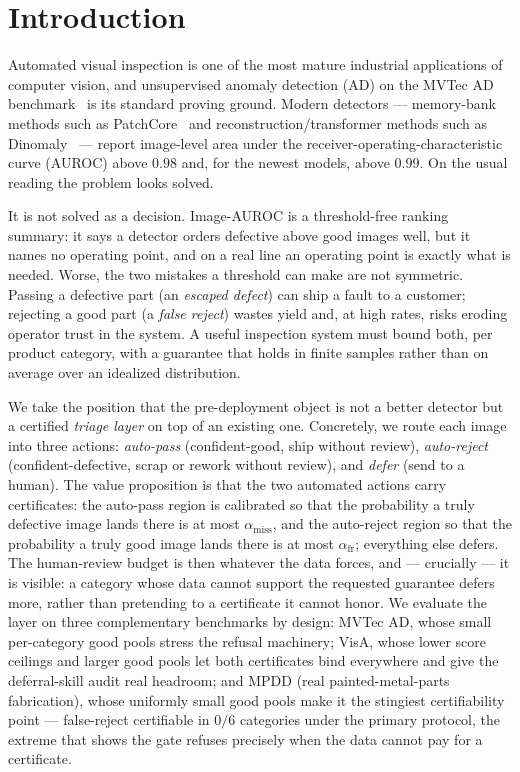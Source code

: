 \documentclass[preprint,11pt]{elsarticle}
\begin{document}

\section{Introduction}
\label{sec:intro}

Automated visual inspection is one of the most mature industrial applications of computer vision,
and unsupervised anomaly detection (AD) on the MVTec AD benchmark~\citep{bergmann2019mvtec} is its
standard proving ground. Modern detectors --- memory-bank methods such as
PatchCore~\citep{roth2022patchcore} and reconstruction/transformer methods such as
Dinomaly~\citep{guo2025dinomaly} --- report image-level area under the receiver-operating-characteristic curve (AUROC) above $0.98$ and, for the newest
models, above $0.99$. On the usual reading the problem looks solved.

It is not solved as a decision. Image-AUROC is a threshold-free ranking summary: it says a
detector orders defective above good images well, but it names no operating point, and on a real
line an operating point is exactly what is needed. Worse, the two mistakes a threshold can make
are not symmetric. Passing a defective part (an \emph{escaped defect}) can ship a fault to a
customer; rejecting a good part (a \emph{false reject}) wastes yield and, at high rates, risks
eroding operator trust in the system. A useful inspection system must bound both, per
product category, with a guarantee that holds in finite samples rather than on average over an
idealized distribution.

We take the position that the pre-deployment object is not a better detector but a certified
\emph{triage layer} on top of an existing one. Concretely, we route each image into three actions:
\emph{auto-pass} (confident-good, ship without review), \emph{auto-reject} (confident-defective,
scrap or rework without review), and \emph{defer} (send to a human). The value proposition is that
the two automated actions carry certificates: the auto-pass region is calibrated so that the
probability a truly defective image lands there is at most $\alpha_{\text{miss}}$, and the
auto-reject region so that the probability a truly good image lands there is at most
$\alpha_{\text{fr}}$; everything else defers. The human-review budget is then whatever the data
forces, and --- crucially --- it is visible: a category whose data cannot support the
requested guarantee defers more, rather than pretending to a certificate it cannot honor.
We evaluate the layer on three complementary benchmarks by design: MVTec AD, whose small
per-category good pools stress the refusal machinery; VisA, whose lower score ceilings and
larger good pools let both certificates bind everywhere and give the deferral-skill audit real
headroom; and MPDD (real painted-metal-parts fabrication), whose uniformly small good pools make
it the stingiest certifiability point --- false-reject certifiable in $0/6$ categories under the
primary protocol, the extreme that shows the gate refuses precisely when the data cannot pay for
a certificate.
\end{document}
